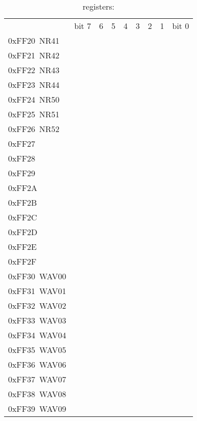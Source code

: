 \begin{landscape}
\begin{table}
  \begin{center}
    \everyrow{\hline}
    \caption{ registers: }
    \ttfamily
    \begin{tabu} to \linewidth {|X[l]|X[c]|X[c]|X[c]|X[c]|X[c]|X[c]|X[c]|X[c]|}
      \rowfont{\small}
      & bit 7 & 6 & 5 & 4 & 3 & 2 & 1 & bit 0 \\
      0xFF20~NR41 & & & & & & & & \\
      0xFF21~NR42 & & & & & & & & \\
      0xFF22~NR43 & & & & & & & & \\
      0xFF23~NR44 & & & & & & & & \\
      0xFF24~NR50 & & & & & & & & \\
      0xFF25~NR51 & & & & & & & & \\
      0xFF26~NR52 & & & & & & & & \\
      0xFF27 &  \\
      0xFF28 &  \\
      0xFF29 &  \\
      0xFF2A &  \\
      0xFF2B &  \\
      0xFF2C &  \\
      0xFF2D &  \\
      0xFF2E &  \\
      0xFF2F &  \\
      0xFF30~WAV00 & & & & & & & & \\
      0xFF31~WAV01 & & & & & & & & \\
      0xFF32~WAV02 & & & & & & & & \\
      0xFF33~WAV03 & & & & & & & & \\
      0xFF34~WAV04 & & & & & & & & \\
      0xFF35~WAV05 & & & & & & & & \\
      0xFF36~WAV06 & & & & & & & & \\
      0xFF37~WAV07 & & & & & & & & \\
      0xFF38~WAV08 & & & & & & & & \\
      0xFF39~WAV09 & & & & & & & & \\

\end{tabu}
\end{center}
\end{table}
\end{landscape}
